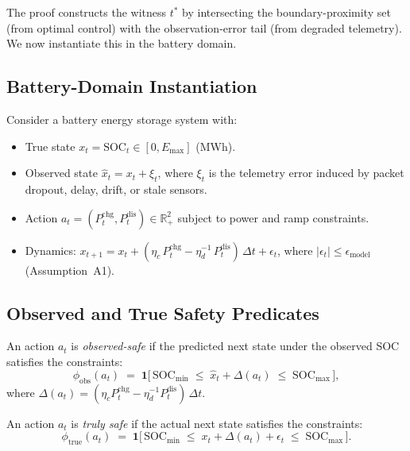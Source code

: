 The proof constructs the witness $t^*$ by intersecting the boundary-proximity
set (from optimal control) with the observation-error tail (from degraded
telemetry).  We now instantiate this in the battery domain.

\subsection{Battery-Domain Instantiation}
\label{sec:battery-setup}

Consider a battery energy storage system with:
\begin{itemize}
  \item True state $x_t = \text{SOC}_t \in [0, E_{\max}]$ (MWh).
  \item Observed state $\hat{x}_t = x_t + \xi_t$, where $\xi_t$ is
    the telemetry error induced by packet dropout, delay, drift, or
    stale sensors.
  \item Action $a_t = (P_t^{\text{chg}}, P_t^{\text{dis}}) \in \mathbb{R}_+^2$
    subject to power and ramp constraints.
  \item Dynamics: $x_{t+1} = x_t + (\eta_c\,P_t^{\text{chg}} -
    \eta_d^{-1}\,P_t^{\text{dis}})\,\Delta t + \epsilon_t$, where
    $|\epsilon_t| \le \epsilon_{\text{model}}$ (Assumption~A1).
\end{itemize}

\subsection{Observed and True Safety Predicates}

\begin{definition}
\label{def:obs-safe}
An action $a_t$ is \emph{observed-safe} if the predicted next state
under the observed SOC satisfies the constraints:
\[
  \phi_{\text{obs}}(a_t) \;=\; \mathbf{1}\!\bigl[\,
    \text{SOC}_{\min} \;\le\; \hat{x}_t + \Delta(a_t) \;\le\;
    \text{SOC}_{\max}\,\bigr],
\]
where $\Delta(a_t) = (\eta_c P_t^{\text{chg}} -
\eta_d^{-1} P_t^{\text{dis}})\,\Delta t$.
\end{definition}

\begin{definition}
\label{def:true-safe}
An action $a_t$ is \emph{truly safe} if the actual next state satisfies
the constraints:
\[
  \phi_{\text{true}}(a_t) \;=\; \mathbf{1}\!\bigl[\,
    \text{SOC}_{\min} \;\le\; x_t + \Delta(a_t) + \epsilon_t \;\le\;
    \text{SOC}_{\max}\,\bigr].
\]
\end{definition}

